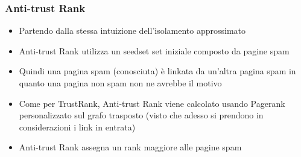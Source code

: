 \documentclass{beamer}
\begin{document}
\begin{frame}
  \frametitle{Anti-trust Rank}
  \begin{itemize}
   \item Partendo dalla stessa intuizione dell'isolamento approssimato 
   \item Anti-trust Rank utilizza un seedset set iniziale composto da pagine spam
   \item Quindi una pagina spam (conosciuta) è linkata da un'altra pagina spam in quanto una pagina non spam non ne avrebbe il motivo 
   \item Come per TrustRank, Anti-trust Rank viene calcolato usando Pagerank personalizzato sul grafo trasposto (visto che adesso si prendono in considerazioni i link in entrata)
   \item Anti-trust Rank assegna un rank maggiore alle pagine spam
  \end{itemize}
\end{frame}
%    
\end{document}
